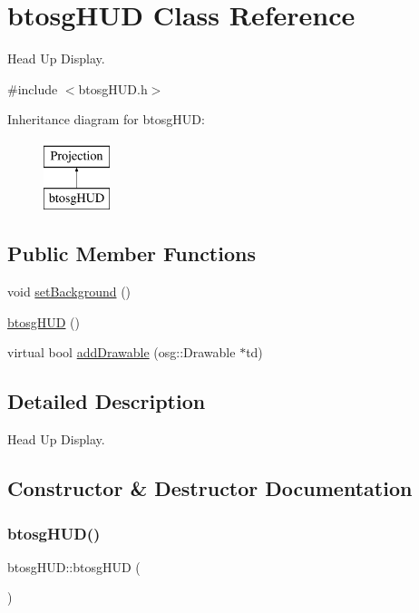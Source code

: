 \hypertarget{classbtosgHUD}{}\section{btosg\+H\+UD Class Reference}
\label{classbtosgHUD}


Head Up Display.  




{\ttfamily \#include $<$btosg\+H\+U\+D.\+h$>$}

Inheritance diagram for btosg\+H\+UD\+:\begin{figure}[H]
\begin{center}
\leavevmode
\includegraphics[height=2.000000cm]{classbtosgHUD}
\end{center}
\end{figure}
\subsection*{Public Member Functions}
\begin{DoxyCompactItemize}
\item 
void \mbox{\hyperlink{classbtosgHUD_a18c1eb80934574e6bdabbbee43e0bfeb}{set\+Background}} ()
\item 
\mbox{\hyperlink{classbtosgHUD_a1aee59dc4eff398996632f1e4b3e70fd}{btosg\+H\+UD}} ()
\item 
virtual bool \mbox{\hyperlink{classbtosgHUD_a182be3e4bdf00f9ff2b9c482833089a4}{add\+Drawable}} (osg\+::\+Drawable $\ast$td)
\end{DoxyCompactItemize}


\subsection{Detailed Description}
Head Up Display. 

\subsection{Constructor \& Destructor Documentation}
\mbox{\label{classbtosgHUD_a1aee59dc4eff398996632f1e4b3e70fd}} 
\subsubsection{\texorpdfstring{btosgHUD()}{btosgHUD()}}
{\footnotesize\ttfamily btosg\+H\+U\+D\+::btosg\+H\+UD (\begin{DoxyParamCaption}{ }\end{DoxyParamCaption})\hspace{0.3cm}{\ttfamily [inline]}}

